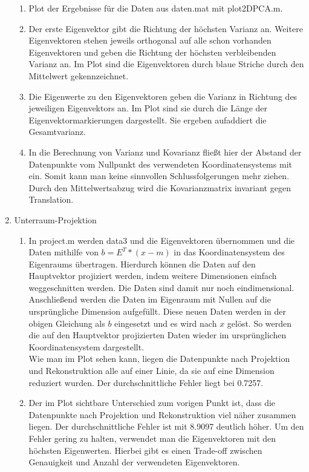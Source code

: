 \documentclass[]{report}
\begin{document}
\begin{enumerate}
\begin{enumerate}
		\item	
		Plot der Ergebnisse für die Daten aus daten.mat mit plot2DPCA.m.
		\item
		Der erste Eigenvektor gibt die Richtung der höchsten Varianz an. Weitere Eigenvektoren stehen jeweils orthogonal auf alle schon vorhanden Eigenvektoren und geben die Richtung der höchsten verbleibenden Varianz an. Im Plot sind die Eigenvektoren durch blaue Striche durch den Mittelwert gekennzeichnet.
		\item
		Die Eigenwerte zu den Eigenvektoren geben die Varianz in Richtung des jeweiligen Eigenvektors an. Im Plot sind sie durch die Länge der Eigenvektormarkierungen dargestellt. Sie ergeben aufaddiert die Gesamtvarianz.
		\item
		In die Berechnung von Varianz und Kovarianz fließt hier der Abstand der Datenpunkte vom Nullpunkt des verwendeten Koordinatensystems mit ein. Somit kann man keine sinnvollen Schlussfolgerungen mehr ziehen. Durch den Mittelwertsabzug wird die Kovarianzmatrix invariant gegen Translation. 
		
	\end{enumerate}
	\item Unterraum-Projektion
	\begin{enumerate}
		\item
		In project.m werden data3 und die Eigenvektoren übernommen und die Daten mithilfe von $b=E^{T}*(x-m)$ in das Koordinatensystem des Eigenraums übertragen. Hierdurch können die Daten auf den Hauptvektor projiziert werden, indem weitere Dimensionen einfach weggeschnitten werden. Die Daten sind damit nur noch eindimensional.\\
		Anschließend werden die Daten im Eigenraum mit Nullen auf die ursprüngliche Dimension aufgefüllt. Diese neuen Daten werden in der obigen Gleichung als $b$ eingesetzt und es wird nach $x$ gelöst. So werden die auf den Hauptvektor projizierten Daten wieder im ursprünglichen Koordinatensystem dargestellt.\\
		Wie man im Plot sehen kann, liegen die Datenpunkte nach Projektion und Rekonstruktion alle auf einer Linie, da sie auf eine Dimension reduziert wurden. Der durchschnittliche Fehler liegt bei 0.7257.
		\item
		Der im Plot sichtbare Unterschied zum vorigen Punkt ist, dass die Datenpunkte nach Projektion und Rekonstruktion viel näher zusammen liegen. Der durchschnittliche Fehler ist mit 8.9097 deutlich höher. Um den Fehler gering zu halten, verwendet man die Eigenvektoren mit den höchsten Eigenwerten. Hierbei gibt es einen Trade-off zwischen Genauigkeit und Anzahl der verwendeten Eigenvektoren.
	\end{enumerate}
	

\end{enumerate}
\end{document}

